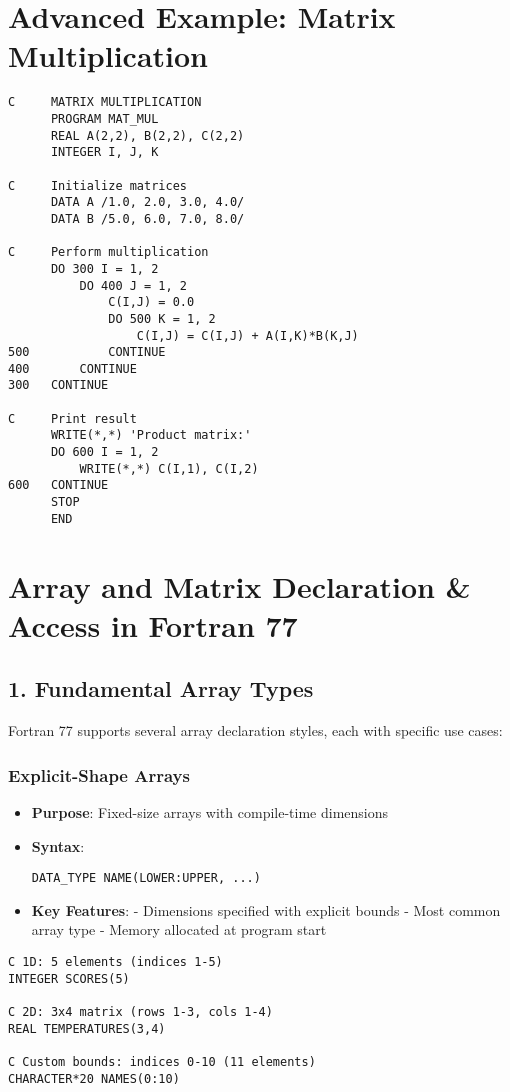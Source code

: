 \documentclass{book}
\begin{document}
\section*{Advanced Example: Matrix Multiplication}
\begin{verbatim}
C     MATRIX MULTIPLICATION
      PROGRAM MAT_MUL
      REAL A(2,2), B(2,2), C(2,2)
      INTEGER I, J, K
      
C     Initialize matrices
      DATA A /1.0, 2.0, 3.0, 4.0/
      DATA B /5.0, 6.0, 7.0, 8.0/

C     Perform multiplication
      DO 300 I = 1, 2
          DO 400 J = 1, 2
              C(I,J) = 0.0
              DO 500 K = 1, 2
                  C(I,J) = C(I,J) + A(I,K)*B(K,J)
500           CONTINUE
400       CONTINUE
300   CONTINUE

C     Print result
      WRITE(*,*) 'Product matrix:'
      DO 600 I = 1, 2
          WRITE(*,*) C(I,1), C(I,2)
600   CONTINUE
      STOP
      END
\end{verbatim}

\section{Array and Matrix Declaration \& Access in Fortran 77}

\subsection*{1. Fundamental Array Types}
Fortran 77 supports several array declaration styles, each with specific use cases:

\subsubsection*{Explicit-Shape Arrays}
\begin{itemize}
\item \textbf{Purpose}: Fixed-size arrays with compile-time dimensions
\item \textbf{Syntax}: 
\begin{verbatim}
DATA_TYPE NAME(LOWER:UPPER, ...)
\end{verbatim}
\item \textbf{Key Features}:
  - Dimensions specified with explicit bounds
  - Most common array type
  - Memory allocated at program start
\end{itemize}

\begin{verbatim}
C 1D: 5 elements (indices 1-5)
INTEGER SCORES(5)       

C 2D: 3x4 matrix (rows 1-3, cols 1-4)
REAL TEMPERATURES(3,4)  

C Custom bounds: indices 0-10 (11 elements)
CHARACTER*20 NAMES(0:10)
\end{verbatim}
\end{document}
